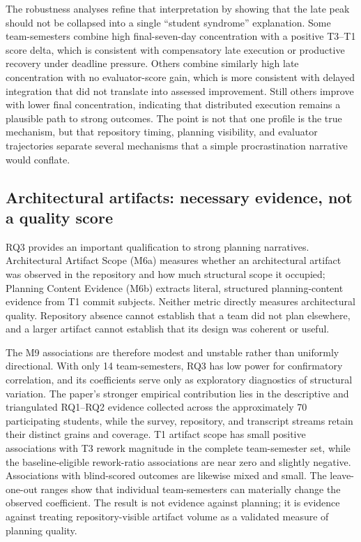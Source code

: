The robustness analyses refine that interpretation by showing that the late
peak should not be collapsed into a single ``student syndrome'' explanation.
Some team-semesters combine high final-seven-day concentration with a positive
T3--T1 score delta, which is consistent with compensatory late execution or
productive recovery under deadline pressure. Others combine similarly high
late concentration with no evaluator-score gain, which is more consistent
with delayed integration that did not translate into assessed improvement.
Still others improve with lower final concentration, indicating that
distributed execution remains a plausible path to strong outcomes. The point
is not that one profile is the true mechanism, but that repository timing,
planning visibility, and evaluator trajectories separate several mechanisms
that a simple procrastination narrative would conflate.

\subsection{Architectural artifacts: necessary evidence, not a quality score}

RQ3 provides an important qualification to strong planning narratives.
Architectural Artifact Scope (M6a)
measures whether an architectural artifact was observed in the repository and
how much structural scope it occupied; Planning Content Evidence (M6b) extracts
literal, structured planning-content evidence from T1 commit subjects. Neither
metric directly
measures architectural quality. Repository absence cannot establish that a team
did not plan elsewhere, and a larger artifact cannot establish that its design
was coherent or useful.

The M9 associations are therefore modest and unstable
rather than uniformly directional. With only 14 team-semesters, RQ3 has low
power for confirmatory correlation, and its coefficients serve only as
exploratory diagnostics of structural variation. The paper's stronger
empirical contribution lies in the descriptive and triangulated RQ1--RQ2
evidence collected across the approximately 70 participating students, while
the survey, repository, and transcript streams retain their distinct grains
and coverage. T1 artifact scope has small positive
associations with T3 rework magnitude in the complete team-semester set, while
the baseline-eligible rework-ratio associations are near zero and slightly
negative. Associations with blind-scored outcomes are likewise mixed and small.
The leave-one-out ranges show that individual team-semesters can materially
change the observed coefficient. The result is not evidence against planning;
it is evidence against treating repository-visible artifact volume as a
validated measure of planning quality.


